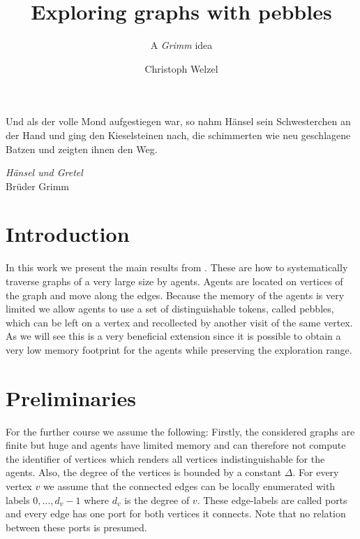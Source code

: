 \documentclass[oneside]{scrartcl}
\begin{document}
\setlength{\epigraphwidth}{0.7\textwidth}

\title{Exploring graphs with pebbles}
\subtitle{A \emph{Grimm} idea}
\author{Christoph Welzel}
\maketitle

\epigraph{Und als der volle Mond aufgestiegen war, so nahm Hänsel sein %
Schwesterchen an der Hand und ging den Kieselsteinen nach, die schimmerten %
wie neu geschlagene Batzen und zeigten ihnen den Weg.}%
{\emph{Hänsel und Gretel}\\Brüder Grimm}

\section{Introduction}
In this work we present the main results from \cite{pebbles}. These are
how to systematically traverse graphs of a very large size by agents.
Agents are located on vertices of the graph and move along the edges. Because
the memory of the agents is very limited we allow agents to use a set of
distinguishable tokens, called pebbles, which can be left on a vertex and
recollected by another visit of the same vertex. As we will see this is a very
beneficial extension since it is possible to obtain a very low memory footprint
for the agents while preserving the exploration range.

\section{Preliminaries}
For the further course we assume the following: Firstly, the considered
graphs are finite but huge and agents have limited memory and can
therefore not compute the identifier of vertices which renders all vertices
indistinguishable for the agents. Also, the degree of the vertices is bounded
by a constant $\Delta$. For every vertex $v$ we assume that the connected edges
can be locally enumerated with labels $0,\dots,d_{v} - 1$ where $d_{v}$ is the
degree of $v$. These edge-labels are called ports and every edge has one port
for both vertices it connects. Note that no relation between these ports is
presumed.
\end{document}
